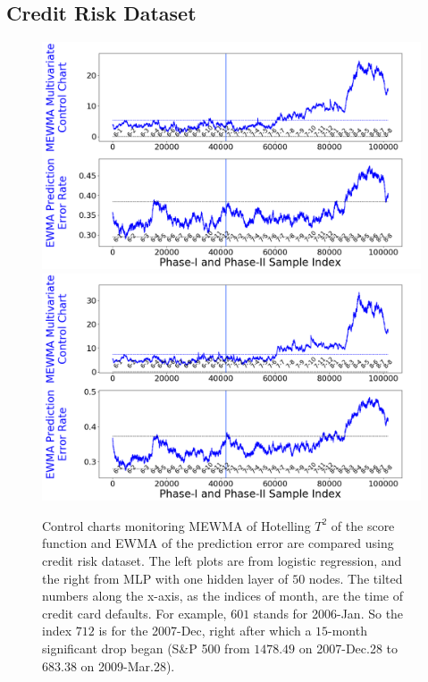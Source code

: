 \documentclass[twoside,11pt]{article}
\begin{document}
\subsection{Credit Risk Dataset}
\label{ss:cr_ds}
\begin{figure}[!htbp]
\centering
\includegraphics[width = 0.49\linewidth]{../figures/v14/credit_default/logi_scal_train_PI/credit_logi_1e-08_0_0001_0_001_99_0.png}
\includegraphics[width = 0.49\linewidth]{../figures/v14/credit_default/logi_nnet_scal_train_PI/credit_logi_0_002_0_0001_0_001_99_0.png}
  \caption{
Control charts monitoring MEWMA of Hotelling $T^2$ of the score function and EWMA of the prediction error are compared using credit risk dataset. The left plots are from logistic regression, and the right from MLP with one hidden layer of $50$ nodes. The tilted numbers along the x-axis, as the indices of month, are the time of credit card defaults. For example, $601$ stands for 2006-Jan. So the index $712$ is for the 2007-Dec, right after which a $15$-month significant drop began (S\&P 500 from $1478.49$ on 2007-Dec.28 to $683.38$ on 2009-Mar.28).
}
\end{figure}
\end{document}
